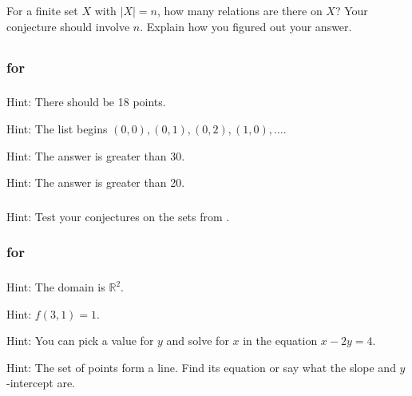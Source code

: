 \begin{exer}[\exerE] %
\label{exer_count_all_relations}
    For a finite set $X$ with $|X|=n$, how many relations are there on $X$?  Your conjecture should involve $n$.  Explain how you figured out your answer.
\end{exer}

\subsection{\answers}

\subsubsection{\answers for 
\subcartprod}

\subsubsection*{ \answers}
\begin{apart}
    \item Hint: There should be 18 points.
    \item Hint: The list begins $(0,0), (0,1), (0,2), (1,0), \ldots$.
    \item Hint: The answer is greater than 30.
    \item Hint: The answer is greater than 20.
\end{apart}

\subsubsection*{ \answers}
Hint: Test your conjectures on the sets from .

\subsubsection{\answers for 
\subfncartprod}

\subsubsection*{ \answers}
\begin{apart}
    \item Hint: The domain is $\mathbb{R}^2$.
    \item Hint: $f(3,1)=1$.
    \item Hint: You can pick a value for $y$ and solve for $x$ in the equation $x-2y=4$.
    \item Hint: The set of points form a line.  Find its equation or say what the slope and $y$-intercept are.
\end{apart}

